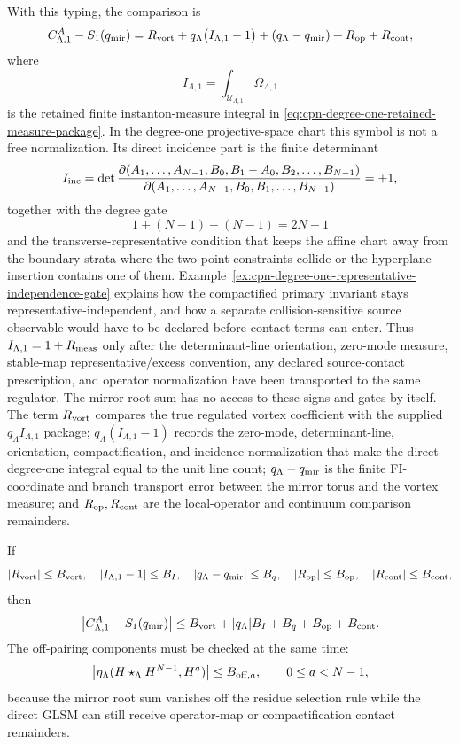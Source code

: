 \begin{remark}
\noindent
With this typing, the comparison is
\begin{equation}
  C_{\Lambda,1}^{A}
  -
  S_1(q_{\rm mir})
  =
  R_{\rm vort}
  +
  q_\Lambda\bigl(I_{\Lambda,1}-1\bigr)
  +
  (q_\Lambda-q_{\rm mir})
  +
  R_{\rm op}
  +
  R_{\rm cont},
  \label{eq:cpn-hv-residue-instanton-cross-check}
\end{equation}
where
\[
  I_{\Lambda,1}
  =
  \int_{\mathcal U_{\Lambda,1}}\Omega_{\Lambda,1}
\]
is the retained finite instanton-measure integral in
\eqref{eq:cpn-degree-one-retained-measure-package}.  In the degree-one
projective-space chart this symbol is not a free normalization.  Its direct
incidence part is the finite determinant
\[
  I_{\rm inc}
  =
  \det
  \frac{
    \partial(A_1,\ldots,A_{N-1},B_0,B_1-A_0,B_2,\ldots,B_{N-1})
  }{
    \partial(A_1,\ldots,A_{N-1},B_0,B_1,\ldots,B_{N-1})
  }
  =+1,
\]
together with the degree gate
\[
  1+(N-1)+(N-1)=2N-1
\]
and the transverse-representative condition that keeps the affine chart away
from the boundary strata where the two point constraints collide or the
hyperplane insertion contains one of them.
Example~\ref{ex:cpn-degree-one-representative-independence-gate} explains how
the compactified primary invariant stays representative-independent, and how a
separate collision-sensitive source observable would have to be declared before
contact terms can enter.  Thus
\(I_{\Lambda,1}=1+R_{\rm meas}\) only after the determinant-line
orientation, zero-mode measure, stable-map representative/excess convention,
any declared source-contact prescription, and operator normalization have been
transported to the same regulator.  The
mirror root sum has no access to these signs and gates by itself.
The term \(R_{\rm vort}\)
compares the true regulated vortex coefficient with the supplied
\(q_\Lambda I_{\Lambda,1}\) package; \(q_\Lambda(I_{\Lambda,1}-1)\) records
the zero-mode, determinant-line, orientation, compactification, and incidence
normalization that make the direct degree-one integral equal to the unit line
count; \(q_\Lambda-q_{\rm mir}\) is the finite FI-coordinate and branch
transport error between the mirror torus and the vortex measure; and
\(R_{\rm op},R_{\rm cont}\) are the local-operator and continuum comparison
remainders.

If
\[
  |R_{\rm vort}|\le B_{\rm vort},\quad
  |I_{\Lambda,1}-1|\le B_I,\quad
  |q_\Lambda-q_{\rm mir}|\le B_q,\quad
  |R_{\rm op}|\le B_{\rm op},\quad
  |R_{\rm cont}|\le B_{\rm cont},
\]
then
\begin{equation}
  \left|
    C_{\Lambda,1}^{A}
    -
    S_1(q_{\rm mir})
  \right|
  \le
  B_{\rm vort}
  +
  |q_\Lambda|B_I
  +
  B_q
  +
  B_{\rm op}
  +
  B_{\rm cont}.
  \label{eq:cpn-hv-residue-instanton-cross-check-bound}
\end{equation}
The off-pairing components must be checked at the same time:
\[
  \left|
    \eta_\Lambda(H\star_\Lambda H^{N-1},H^a)
  \right|
  \le B_{{\rm off},a},
  \qquad 0\le a<N-1,
\]
because the mirror root sum vanishes off the residue selection rule while the
direct GLSM can still receive operator-map or compactification contact
remainders.


\end{remark}
